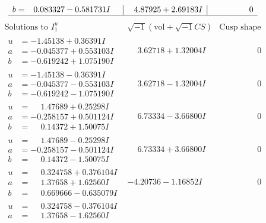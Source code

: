 \documentclass[1p]{elsarticle_modified}
\theoremstyle{definition}
\newcommand{\I}{\sqrt{-1}}
\begin{document}
$$\begin{array}{c|c|c}
\begin{aligned}
b &= \phantom{-}0.083327 - 0.581731 I\end{aligned}
 & \phantom{-}4.87925 + 2.69183 I & \phantom{-0.000000 } 0\\
 \hline 
 \end{array}$$\newpage$$\begin{array}{c|c|c}  
\text{Solutions to }I^u_{1}& \I (\text{vol} + \sqrt{-1}CS) & \text{Cusp shape}\\
 \hline 
\begin{aligned}
u &= -1.45138 + 0.36391 I \\
a &= -0.045377 + 0.553103 I \\
b &= -0.619242 + 1.075190 I\end{aligned}
 & \phantom{-}3.62718 + 1.32004 I & \phantom{-0.000000 } 0 \\ \hline\begin{aligned}
u &= -1.45138 - 0.36391 I \\
a &= -0.045377 - 0.553103 I \\
b &= -0.619242 - 1.075190 I\end{aligned}
 & \phantom{-}3.62718 - 1.32004 I & \phantom{-0.000000 } 0 \\ \hline\begin{aligned}
u &= \phantom{-}1.47689 + 0.25298 I \\
a &= -0.258157 + 0.501124 I \\
b &= \phantom{-}0.14372 + 1.50075 I\end{aligned}
 & \phantom{-}6.73334 - 3.66800 I & \phantom{-0.000000 } 0 \\ \hline\begin{aligned}
u &= \phantom{-}1.47689 - 0.25298 I \\
a &= -0.258157 - 0.501124 I \\
b &= \phantom{-}0.14372 - 1.50075 I\end{aligned}
 & \phantom{-}6.73334 + 3.66800 I & \phantom{-0.000000 } 0 \\ \hline\begin{aligned}
u &= \phantom{-}0.324758 + 0.376104 I \\
a &= \phantom{-}1.37658 + 1.62560 I \\
b &= \phantom{-}0.669666 - 0.635079 I\end{aligned}
 & -4.20736 - 1.16852 I & \phantom{-0.000000 } 0 \\ \hline\begin{aligned}
u &= \phantom{-}0.324758 - 0.376104 I \\
a &= \phantom{-}1.37658 - 1.62560 I \\

\end{aligned}
\end{array}$$
\end{document}
